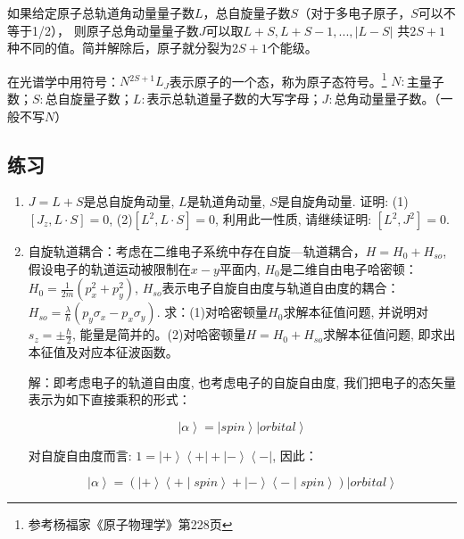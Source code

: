 如果给定原子总轨道角动量量子数$L$，总自旋量子数$S$（对于多电子原子，$S$可以不等于1/2），
则原子总角动量量子数$J$可以取$L + S, L + S - 1 , ... ,\left| {L - S} \right|$
共$2S + 1$种不同的值。简并解除后，原子就分裂为$2S + 1$个能级。

在光谱学中用符号：$N{}^{2S + 1}L_J $表示原子的一个态，称为原子态符号。\footnote{参考杨福家《原子物理学》第228页}
$N:$主量子数；$S:$总自旋量子数；$L:$表示总轨道量子数的大写字母；$J:$总角动量量子数。（一般不写$N$）



\subsection*{练习}

\begin{enumerate}

\item $J = L + S$是总自旋角动量, $L$是轨道角动量, $S$是自旋角动量. 证明:
(1)$\left[ J_z, L \cdot S  \right] = 0$, (2)$\left[ L^2 , L \cdot S
\right] = 0$, 利用此一性质, 请继续证明: $\left[ L^2, J^2 \right] =
0$.

\item 自旋轨道耦合：考虑在二维电子系统中存在自旋---轨道耦合，$H = H_0 +
H_{so}$, 假设电子的轨道运动被限制在$x-y$平面内,
$H_0$是二维自由电子哈密顿：$H_0 = \frac{1}{2m}(p_x^2 + p_y^2)$,
$H_{so}$表示电子自旋自由度与轨道自由度的耦合：$H_{so} =
\frac{\lambda}{\hbar}(p_y \sigma_x - p_x \sigma_y)$.
求：(1)对哈密顿量$H_0$求解本征值问题, 并说明对$s_z = \pm
\frac{\hbar}{2}$, 能量是简并的。(2)对哈密顿量$H = H_0 +
H_{so}$求解本征值问题, 即求出本征值及对应本征波函数。

解：即考虑电子的轨道自由度, 也考虑电子的自旋自由度,
我们把电子的态矢量表示为如下直接乘积的形式：

\begin{equation*}
    \left| \alpha \right\rangle = \left| spin \right\rangle \left|
    orbital
    \right\rangle
\end{equation*}

对自旋自由度而言: $1 = \left| + \right\rangle \left\langle + \right|
+ \left| - \right\rangle \left\langle - \right|$, 因此：

\begin{equation*}
\left| \alpha \right\rangle = \left( \left| + \right\rangle
\left\langle + \mid spin \right\rangle + \left| - \right\rangle
\left\langle - \mid spin \right\rangle \right) \left| orbital
\right\rangle
\end{equation*}


\end{enumerate}
